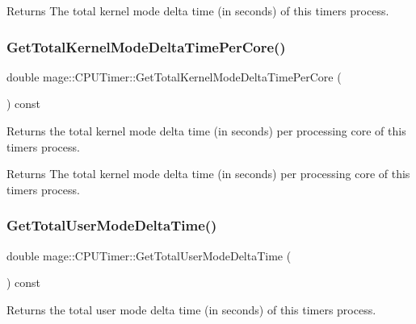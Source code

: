 \begin{DoxyReturn}{Returns}
The total kernel mode delta time (in seconds) of this timer\textquotesingle{}s process. 
\end{DoxyReturn}
\hypertarget{classmage_1_1_c_p_u_timer_abe27bc40d9e61bdf97755706b4be238c}{}\label{classmage_1_1_c_p_u_timer_abe27bc40d9e61bdf97755706b4be238c} 
\subsubsection{\texorpdfstring{Get\+Total\+Kernel\+Mode\+Delta\+Time\+Per\+Core()}{GetTotalKernelModeDeltaTimePerCore()}}
{\footnotesize\ttfamily double mage\+::\+C\+P\+U\+Timer\+::\+Get\+Total\+Kernel\+Mode\+Delta\+Time\+Per\+Core (\begin{DoxyParamCaption}{ }\end{DoxyParamCaption}) const}

Returns the total kernel mode delta time (in seconds) per processing core of this timer\textquotesingle{}s process.

\begin{DoxyReturn}{Returns}
The total kernel mode delta time (in seconds) per processing core of this timer\textquotesingle{}s process. 
\end{DoxyReturn}
\hypertarget{classmage_1_1_c_p_u_timer_a098c9ecc1f84918970b4644f0ba8bfc4}{}\label{classmage_1_1_c_p_u_timer_a098c9ecc1f84918970b4644f0ba8bfc4} 
\subsubsection{\texorpdfstring{Get\+Total\+User\+Mode\+Delta\+Time()}{GetTotalUserModeDeltaTime()}}
{\footnotesize\ttfamily double mage\+::\+C\+P\+U\+Timer\+::\+Get\+Total\+User\+Mode\+Delta\+Time (\begin{DoxyParamCaption}{ }\end{DoxyParamCaption}) const}

Returns the total user mode delta time (in seconds) of this timer\textquotesingle{}s process.

